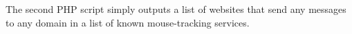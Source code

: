 \documentclass[letterpaper,twocolumn,10pt]{article}
\begin{document}
The second PHP script simply outputs a list of websites that send any messages to any domain in a list of known mouse-tracking services.

{\footnotesize 
}


\theendnotes
\end{document}
